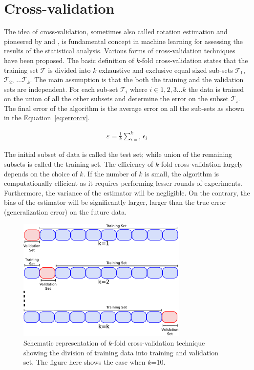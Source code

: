 \section{Cross-validation}
\label{s:crossvalidation}

The idea of cross-validation, sometimes also called rotation estimation and pioneered by \cite{crossvalind} and \cite{monsteller}, is fundamental concept in machine learning for assessing the results of the statistical analysis. Various forms of cross-validation techniques have been proposed. The basic definition of $k$-fold cross-validation
states that the training set $\mathcal{T}$ is divided into $k$ exhaustive and exclusive equal sized sub-sets $\mathcal{T}_1$, $\mathcal{T}_2$, $\ldots \mathcal{T}_k$. The main assumption is that the both the training and the validation sets are independent. For each sub-set $\mathcal{T}_i$ where $i \in 1, 2, 3 \ldots k$ the data is trained on the union of all the other subsets and determine the error on the subset $\mathcal{T}_i$. The final error of the algorithm is the average error on all the sub-sets as shown in the Equation~\ref{eq:errorcv}.

\begin{eqnarray}
\label{eq:errorcv}
\varepsilon =\frac{1}{k} \sum_{i=1}^{k} \epsilon_{i}
\end{eqnarray}


The initial subset of data is called the test set; while union of the remaining subsets is called the training set. The efficiency of $k$-fold cross-validation largely depends on the choice of $k$. If the number of $k$ is small, the algorithm is computationally efficient as it requires performing lesser rounds of experiments. Furthermore, the variance of the estimator will be negligible. On the contrary, the bias of the estimator will be significantly larger, larger than the true error (generalization error) on the future data. 

\begin{figure}[h!]
\centering
\includegraphics[width=0.75\textwidth]{figures/kfold}
\caption[$k-$fold cross-validation]{Schematic representation of $k$-fold cross-validation technique showing the division of training data into training and validation set. The figure here shows the case when $k$=10.}\label{Fig:kfold}
\end{figure}


